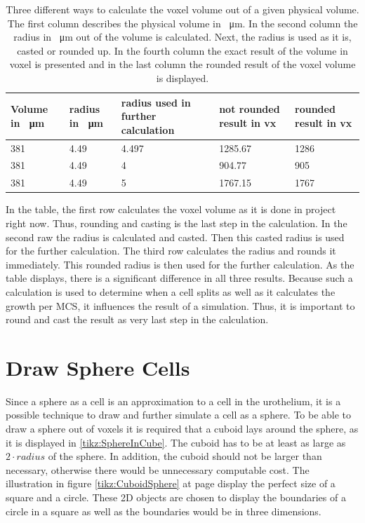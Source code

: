 \begin{table}[h]
\centering
\caption{Three different ways to calculate the voxel volume out of a given physical volume. The first column describes the physical volume in \SI{}{\micro\metre}. In the second column the radius in \SI{}{\micro\metre} out of the volume is calculated. Next, the radius is used as it is, casted or rounded up. In the fourth column the exact result of the volume in voxel is presented and in the last column the rounded result of the voxel volume is displayed.}
\renewcommand{\arraystretch}{1.5}
	\begin{tabularx}{\textwidth}{X||X||X||X||X}
		Volume in \SI{}{\micro\metre} & radius in \SI{}{\micro\metre} & radius used in further calculation & not rounded result in vx & rounded result in vx  \\
		\hline
		381 & 4.49 & 4.497 & 1285.67 & 1286 \\
		
		381 & 4.49 & 4 & 904.77 & 905\\
		
		381 & 4.49 & 5 & 1767.15 & 1767\\

	\end{tabularx}
	\label{tbl:Approximation error}
\end{table}

In the table, the first row calculates the voxel volume as it is done in project right now. Thus, rounding and casting is the last step in the calculation. In the second raw the radius is calculated and casted. Then this casted radius is used for the further calculation. The third row calculates the radius and rounds it immediately. This rounded radius is then used for the further calculation. \newline
As the table displays, there is a significant difference in all three results. Because such a calculation is used to determine when a cell splits as well as it calculates the growth per \ac{MCS}, it influences the result of a simulation. Thus, it is important to round and cast the result as very last step in the calculation.




\section{Draw Sphere Cells}
Since a sphere as a cell is an approximation to a cell in the urothelium, it is a possible technique to draw and further simulate a cell as a sphere. \newline 
To be able to draw a sphere out of voxels it is required that a cuboid lays around the sphere, as it is displayed in \ref{tikz:SphereInCube}. The cuboid has to be at least as large as $2 \cdot radius$ of the sphere. In addition, the cuboid should not be larger than necessary, otherwise there would be unnecessary computable cost. The illustration in figure \ref{tikz:CuboidSphere} at page \pageref{tikz:CuboidSphere} display the perfect size of a square and a circle. These 2D objects are chosen to display the boundaries of a circle in a square as well as the boundaries would be in three dimensions.


